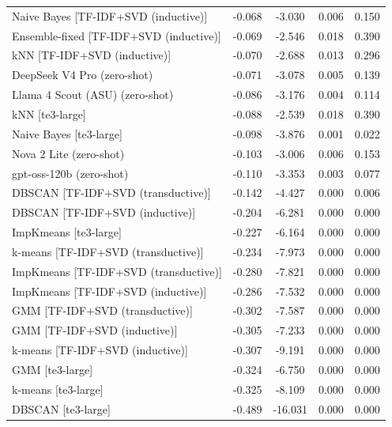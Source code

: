 \begin{table}[htbp]
\begin{tabular}{lcccc}
Naive Bayes [TF-IDF+SVD (inductive)] & -0.068 & -3.030 & 0.006 & 0.150 \\
Ensemble-fixed [TF-IDF+SVD (inductive)] & -0.069 & -2.546 & 0.018 & 0.390 \\
kNN [TF-IDF+SVD (inductive)] & -0.070 & -2.688 & 0.013 & 0.296 \\
DeepSeek V4 Pro (zero-shot) & -0.071 & -3.078 & 0.005 & 0.139 \\
Llama 4 Scout (ASU) (zero-shot) & -0.086 & -3.176 & 0.004 & 0.114 \\
kNN [te3-large] & -0.088 & -2.539 & 0.018 & 0.390 \\
Naive Bayes [te3-large] & -0.098 & -3.876 & 0.001 & 0.022 \\
Nova 2 Lite (zero-shot) & -0.103 & -3.006 & 0.006 & 0.153 \\
gpt-oss-120b (zero-shot) & -0.110 & -3.353 & 0.003 & 0.077 \\
DBSCAN [TF-IDF+SVD (transductive)] & -0.142 & -4.427 & 0.000 & 0.006 \\
DBSCAN [TF-IDF+SVD (inductive)] & -0.204 & -6.281 & 0.000 & 0.000 \\
ImpKmeans [te3-large] & -0.227 & -6.164 & 0.000 & 0.000 \\
k-means [TF-IDF+SVD (transductive)] & -0.234 & -7.973 & 0.000 & 0.000 \\
ImpKmeans [TF-IDF+SVD (transductive)] & -0.280 & -7.821 & 0.000 & 0.000 \\
ImpKmeans [TF-IDF+SVD (inductive)] & -0.286 & -7.532 & 0.000 & 0.000 \\
GMM [TF-IDF+SVD (transductive)] & -0.302 & -7.587 & 0.000 & 0.000 \\
GMM [TF-IDF+SVD (inductive)] & -0.305 & -7.233 & 0.000 & 0.000 \\
k-means [TF-IDF+SVD (inductive)] & -0.307 & -9.191 & 0.000 & 0.000 \\
GMM [te3-large] & -0.324 & -6.750 & 0.000 & 0.000 \\
k-means [te3-large] & -0.325 & -8.109 & 0.000 & 0.000 \\
DBSCAN [te3-large] & -0.489 & -16.031 & 0.000 & 0.000 \\
\bottomrule
\end{tabular}
\end{table}